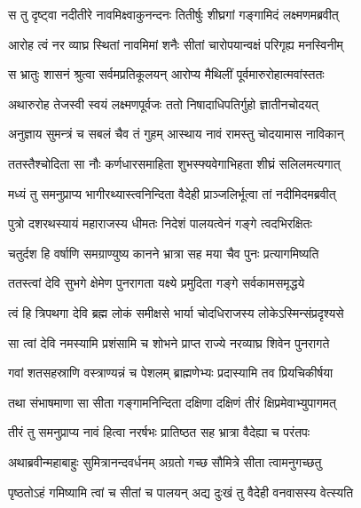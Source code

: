 \twolineshloka
{स तु दृष्ट्वा नदीतीरे नावमिक्ष्वाकुनन्दनः}
{तितीर्षुः शीघ्रगां गङ्गामिदं लक्ष्मणमब्रवीत्} %

\twolineshloka
{आरोह त्वं नर व्याघ्र स्थितां नावमिमां शनैः}
{सीतां चारोपयान्वक्षं परिगृह्य मनस्विनीम्} %

\twolineshloka
{स भ्रातुः शासनं श्रुत्वा सर्वमप्रतिकूलयन्}
{आरोप्य मैथिलीं पूर्वमारुरोहात्मवांस्ततः} %

\twolineshloka
{अथारुरोह तेजस्वी स्वयं लक्ष्मणपूर्वजः}
{ततो निषादाधिपतिर्गुहो ज्ञातीनचोदयत्} %

\twolineshloka
{अनुज्ञाय सुमन्त्रं च सबलं चैव तं गुहम्}
{आस्थाय नावं रामस्तु चोदयामास नाविकान्} %

\twolineshloka
{ततस्तैश्चोदिता सा नौः कर्णधारसमाहिता}
{शुभस्फ्यवेगाभिहता शीघ्रं सलिलमत्यगात्} %

\twolineshloka
{मध्यं तु समनुप्राप्य भागीरथ्यास्त्वनिन्दिता}
{वैदेही प्राञ्जलिर्भूत्वा तां नदीमिदमब्रवीत्} %

\twolineshloka
{पुत्रो दशरथस्यायं महाराजस्य धीमतः}
{निदेशं पालयत्वेनं गङ्गे त्वदभिरक्षितः} %

\twolineshloka
{चतुर्दश हि वर्षाणि समग्राण्युष्य कानने}
{भ्रात्रा सह मया चैव पुनः प्रत्यागमिष्यति} %

\twolineshloka
{ततस्त्वां देवि सुभगे क्षेमेण पुनरागता}
{यक्ष्ये प्रमुदिता गङ्गे सर्वकामसमृद्धये} %

\twolineshloka
{त्वं हि त्रिपथगा देवि ब्रह्म लोकं समीक्षसे}
{भार्या चोदधिराजस्य लोकेऽस्मिन्संप्रदृश्यसे} %

\twolineshloka
{सा त्वां देवि नमस्यामि प्रशंसामि च शोभने}
{प्राप्त राज्ये नरव्याघ्र शिवेन पुनरागते} %

\twolineshloka
{गवां शतसहस्राणि वस्त्राण्यन्नं च पेशलम्}
{ब्राह्मणेभ्यः प्रदास्यामि तव प्रियचिकीर्षया} %

\twolineshloka
{तथा संभाषमाणा सा सीता गङ्गामनिन्दिता}
{दक्षिणा दक्षिणं तीरं क्षिप्रमेवाभ्युपागमत्} %

\twolineshloka
{तीरं तु समनुप्राप्य नावं हित्वा नरर्षभः}
{प्रातिष्ठत सह भ्रात्रा वैदेह्या च परंतपः} %

\twolineshloka
{अथाब्रवीन्महाबाहुः सुमित्रानन्दवर्धनम्}
{अग्रतो गच्छ सौमित्रे सीता त्वामनुगच्छतु} %

\twolineshloka
{पृष्ठतोऽहं गमिष्यामि त्वां च सीतां च पालयन्}
{अद्य दुःखं तु वैदेही वनवासस्य वेत्स्यति} %

